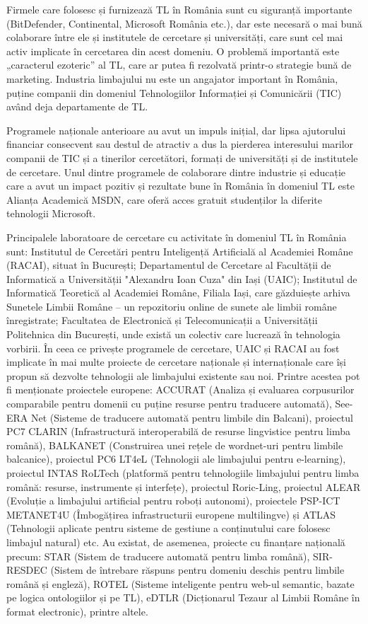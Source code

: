 \begin{multicols}{2}
Firmele care folosesc și furnizează TL în România sunt cu siguranță importante (BitDefender, Continental, Microsoft România etc.), dar este necesară o mai bună colaborare între ele și institutele de cercetare și universități, care sunt cel mai activ implicate în cercetarea din acest domeniu. O problemă importantă este „caracterul ezoteric” al TL, care ar putea fi rezolvată printr-o strategie bună de marketing. Industria limbajului nu este un angajator important în România, puține companii din domeniul Tehnologiilor Informației și Comunicării (TIC) având deja departamente de TL.

Programele naționale anterioare au avut un impuls inițial, dar lipsa ajutorului financiar consecvent sau destul de atractiv a dus la pierderea interesului marilor companii de TIC și a tinerilor cercetători, formați de universități și de institutele de cercetare. Unul dintre programele de colaborare dintre industrie și educație care a avut un impact pozitiv și rezultate bune în România în domeniul TL este Alianța Academică MSDN, care oferă acces gratuit studenților la diferite tehnologii Microsoft. 

Principalele laboratoare de cercetare cu activitate în domeniul TL în România sunt: Institutul de Cercetări pentru Inteligență Artificială al Academiei Române (RACAI), situat în București; Departamentul de Cercetare al Facultății de Informatică a Universității "Alexandru Ioan Cuza" din Iași (UAIC); Institutul de Informatică Teoretică al Academiei Române, Filiala Iași, care găzduiește arhiva Sunetele Limbii Române -- un repozitoriu online de sunete ale limbii române înregistrate; Facultatea de Electronică și Telecomunicații a Universității Politehnica din București, unde există un colectiv care lucrează în tehnologia vorbirii. În ceea ce privește programele de cercetare, UAIC și RACAI au fost implicate în mai multe proiecte de cercetare naționale și internaționale care își propun să dezvolte tehnologii ale limbajului existente sau noi. Printre acestea pot fi menționate proiectele europene: ACCURAT (Analiza și evaluarea corpusurilor comparabile pentru domenii cu puține resurse pentru traducere automată), See-ERA Net (Sisteme de traducere automată pentru limbile din Balcani), proiectul PC7 CLARIN (Infrastructură interoperabilă de resurse lingvistice pentru limba română), BALKANET (Construirea unei rețele de wordnet-uri pentru limbile balcanice), proiectul PC6 LT4eL (Tehnologii ale limbajului pentru e-learning), proiectul INTAS RoLTech (platformă pentru tehnologiile limbajului pentru limba română: resurse, instrumente și interfețe), proiectul Roric-Ling, proiectul ALEAR (Evoluție a limbajului artificial pentru roboți autonomi), proiectele PSP-ICT METANET4U (Îmbogățirea infrastructurii europene multilingve) și ATLAS (Tehnologii aplicate pentru sisteme de gestiune a conținutului care folosesc limbajul natural) etc. Au existat, de asemenea, proiecte cu finanțare națională precum: STAR (Sistem de traducere automată pentru limba română), SIR-RESDEC (Sistem de întrebare răspuns pentru domeniu deschis pentru limbile română și engleză), ROTEL (Sisteme inteligente pentru web-ul semantic, bazate pe logica ontologiilor și pe TL), eDTLR (Dicționarul Tezaur al Limbii Române în format electronic), printre altele.


\end{multicols}
